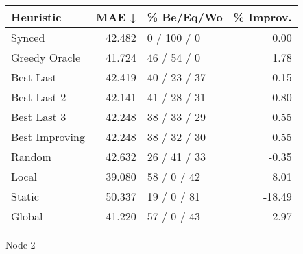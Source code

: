 \begin{tabular}{lrlr}
\toprule
\textbf{Heuristic} & \textbf{MAE ↓} & \textbf{\% Be/Eq/Wo} & \textbf{\% Improv.} \\
\midrule
            Synced &         42.482 &          0 / 100 / 0 &                0.00 \\
     Greedy Oracle &         41.724 &          46 / 54 / 0 &                1.78 \\
         Best Last &         42.419 &         40 / 23 / 37 &                0.15 \\
       Best Last 2 &         42.141 &         41 / 28 / 31 &                0.80 \\
       Best Last 3 &         42.248 &         38 / 33 / 29 &                0.55 \\
    Best Improving &         42.248 &         38 / 32 / 30 &                0.55 \\
            Random &         42.632 &         26 / 41 / 33 &               -0.35 \\
             Local &         39.080 &          58 / 0 / 42 &                8.01 \\
            Static &         50.337 &          19 / 0 / 81 &              -18.49 \\
            Global &         41.220 &          57 / 0 / 43 &                2.97 \\
\bottomrule
\end{tabular}
\caption{Node 2}
\label{tab:iid_lr05_le1_bs2_2}
